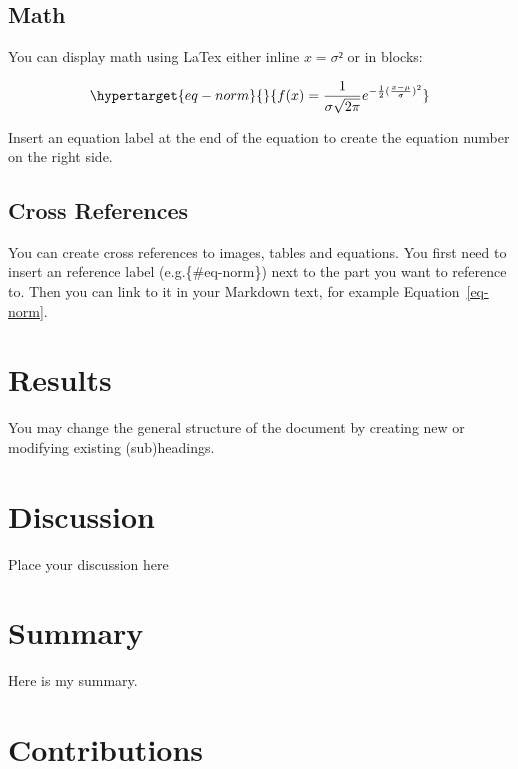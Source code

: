 \documentclass[
]{article}
\begin{document}
\hypertarget{math}{%
\subsection{Math}\label{math}}

You can display math using LaTex either inline \(x = \sigma²\) or in
blocks:

\begin{equation}\protect\hypertarget{eq-norm}{}{
f(x) = {{1}\over{\sigma}\sqrt{2\pi}}e^{-{1\over{2}}({x-\mu\over{\sigma}})^2}
}\label{eq-norm}\end{equation}

Insert an equation label at the end of the equation to create the
equation number on the right side.

\hypertarget{cross-references}{%
\subsection{Cross References}\label{cross-references}}

You can create cross references to images, tables and equations. You
first need to insert an reference label (e.g.\{\#eq-norm\}) next to the
part you want to reference to. Then you can link to it in your Markdown
text, for example Equation~\ref{eq-norm}.

\hypertarget{results}{%
\section{Results}\label{results}}

You may change the general structure of the document by creating new or
modifying existing (sub)headings.

\hypertarget{discussion}{%
\section{Discussion}\label{discussion}}

Place your discussion here

\hypertarget{summary}{%
\section{Summary}\label{summary}}

Here is my summary.

\hypertarget{contributions}{%
\section{Contributions}\label{contributions}}
\end{document}

